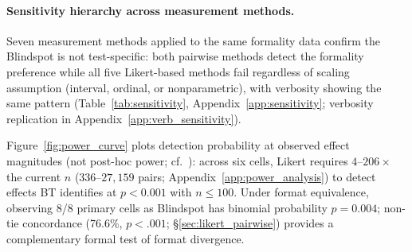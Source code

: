 \paragraph{Sensitivity hierarchy across measurement methods.}
Seven measurement methods applied to the same formality data confirm the Blindspot is not test-specific: both pairwise methods detect the formality preference while all five Likert-based methods fail regardless of scaling assumption (interval, ordinal, or nonparametric), with verbosity showing the same pattern (Table~\ref{tab:sensitivity}, Appendix~\ref{app:sensitivity}; verbosity replication in Appendix~\ref{app:verb_sensitivity}).

Figure~\ref{fig:power_curve} plots detection probability at observed effect magnitudes (not post-hoc power; cf.\ \citealt{hoenig2001abuse}): across six cells, Likert requires $4$--$206\times$ the current $n$ ($336$--$27{,}159$ pairs; Appendix~\ref{app:power_analysis}) to detect effects BT identifies at $p < 0.001$ with $n \leq 100$.
Under format equivalence, observing 8/8 primary cells as Blindspot has binomial probability $p = 0.004$; non-tie concordance (76.6\%, $p < .001$; \S\ref{sec:likert_pairwise}) provides a complementary formal test of format divergence.
